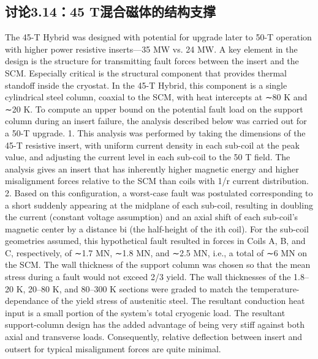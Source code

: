\subsection{讨论3.14：45 T混合磁体的结构支撑}
The 45-T Hybrid was designed with potential for upgrade later to 50-T operation
with higher power resistive inserts—35 MW vs. 24 MW. A key element in the
design is the structure for transmitting fault forces between the insert and the
SCM. Especially critical is the structural component that provides thermal standoff inside the cryostat. In the 45-T Hybrid, this component is a single cylindrical
steel column, coaxial to the SCM, with heat intercepts at ∼80 K and ∼20 K. To
compute an upper bound on the potential fault load on the support column during
an insert failure, the analysis described below was carried out for a 50-T upgrade.
1. This analysis was performed by taking the dimensions of the 45-T resistive
insert, with uniform current density in each sub-coil at the peak value, and
adjusting the current level in each sub-coil to the 50 T field. The analysis gives
an insert that has inherently higher magnetic energy and higher misalignment
forces relative to the SCM than coils with 1/r current distribution.
2. Based on this configuration, a worst-case fault was postulated corresponding
to a short suddenly appearing at the midplane of each sub-coil, resulting in
doubling the current (constant voltage assumption) and an axial shift of each
sub-coil’s magnetic center by a distance bi (the half-height of the ith coil). For
the sub-coil geometries assumed, this hypothetical fault resulted in forces in
Coils A, B, and C, respectively, of ∼1.7 MN, ∼1.8 MN, and ∼2.5 MN, i.e., a
total of ∼6 MN on the SCM. The wall thickness of the support column was
chosen so that the mean stress during a fault would not exceed 2/3 yield. The
wall thicknesses of the 1.8–20 K, 20–80 K, and 80–300 K sections were graded
to match the temperature-dependance of the yield stress of austenitic steel.
The resultant conduction heat input is a small portion of the system’s total
cryogenic load. The resultant support-column design has the added advantage
of being very stiff against both axial and transverse loads. Consequently,
relative deflection between insert and outsert for typical misalignment forces
are quite minimal.
\newpage



